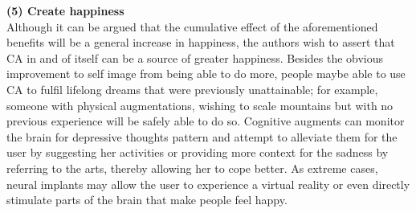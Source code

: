 {\bf (5) Create happiness} \\
Although it can be argued that the cumulative effect of the aforementioned benefits will be a general increase in happiness, the authors wish to assert that CA in and of itself can be a source of greater happiness. Besides the obvious improvement to self image from being able to do more, people maybe able to use CA to fulfil lifelong dreams that were previously unattainable; for example, someone with physical augmentations, wishing to scale mountains but with no previous experience will be safely able to do so. Cognitive augments can monitor the brain for depressive thoughts pattern and attempt to alleviate them for the user by suggesting her activities or providing more context for the sadness by referring to the arts, thereby allowing her to cope better. As extreme cases, neural implants may allow the user to experience a virtual reality or even directly stimulate parts of the brain that make people feel happy.



